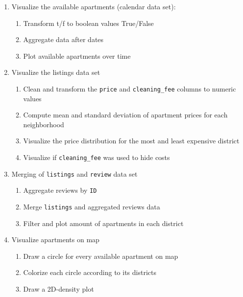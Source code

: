 \documentclass[
  11pt,
]{article}
\begin{document}
\begin{enumerate}
\def\labelenumi{\arabic{enumi}.}
\item
  Visualize the available apartments (calendar data set):

  \begin{enumerate}
  \def\labelenumii{\alph{enumii}.}
  \item
    Transform t/f to boolean values True/False
  \item
    Aggregate data after dates
  \item
    Plot available apartments over time
  \end{enumerate}
\item
  Visualize the listings data set

  \begin{enumerate}
  \def\labelenumii{\alph{enumii}.}
  \item
    Clean and transform the \texttt{price} and \texttt{cleaning\_fee} columns to numeric values
  \item
    Compute mean and standard deviation of apartment prices for each neighborhood
  \item
    Visualize the price distribution for the most and least expensive district
  \item
    Visualize if \texttt{cleaning\_fee} was used to hide costs
  \end{enumerate}
\item
  Merging of \texttt{listings} and \texttt{review} data set

  \begin{enumerate}
  \def\labelenumii{\alph{enumii}.}
  \item
    Aggregate reviews by \texttt{ID}
  \item
    Merge \texttt{listings} and aggregated reviews data
  \item
    Filter and plot amount of apartments in each district
  \end{enumerate}
\item
  Visualize apartments on map

  \begin{enumerate}
  \def\labelenumii{\alph{enumii}.}
  \item
    Draw a circle for every available apartment on map
  \item
    Colorize each circle according to its districts
  \item
    Draw a 2D-density plot
  \end{enumerate}
\end{enumerate}
\end{document}
